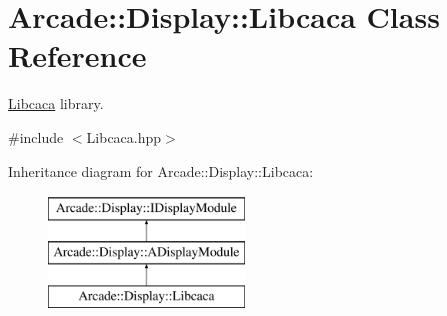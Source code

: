 \hypertarget{classArcade_1_1Display_1_1Libcaca}{}\section{Arcade\+::Display\+::Libcaca Class Reference}
\label{classArcade_1_1Display_1_1Libcaca}


\mbox{\hyperlink{classArcade_1_1Display_1_1Libcaca}{Libcaca}} library.  




{\ttfamily \#include $<$Libcaca.\+hpp$>$}

Inheritance diagram for Arcade\+::Display\+::Libcaca\+:\begin{figure}[H]
\begin{center}
\leavevmode
\includegraphics[height=3.000000cm]{classArcade_1_1Display_1_1Libcaca}
\end{center}
\end{figure}
